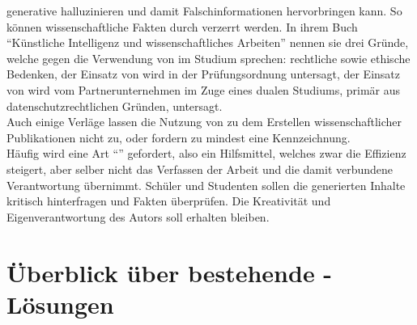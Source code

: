 \documentclass[../main.tex]{subfiles}
\begin{document}
generative  halluzinieren und damit Falschinformationen hervorbringen kann. So können wissenschaftliche Fakten durch  verzerrt werden. In ihrem Buch "`Künstliche Intelligenz und wissenschaftliches Arbeiten"' nennen sie drei 
Gründe, welche gegen die Verwendung von  im Studium sprechen: rechtliche sowie ethische Bedenken, der Einsatz von  wird in der Prüfungsordnung untersagt, 
der Einsatz von  wird vom Partnerunternehmen im Zuge eines dualen Studiums, primär aus datenschutzrechtlichen Gründen, untersagt.\cite{BucherSchwarzerHolzwweißig} \\Auch einige Verläge lassen 
die Nutzung von  zu dem Erstellen wissenschaftlicher Publikationen nicht zu, oder fordern zu mindest eine Kennzeichnung\cite{ZukunftWissenschaftlichesPublizieren}.\\ 
Häufig wird eine Art "`"' gefordert, also ein Hilfsmittel, welches zwar die Effizienz steigert, aber selber nicht das Verfassen der 
Arbeit und die damit verbundene Verantwortung übernimmt. Schüler und Studenten sollen die generierten Inhalte kritisch hinterfragen und Fakten überprüfen. Die Kreativität und 
Eigenverantwortung des Autors soll erhalten bleiben.\cite{BucherSchwarzerHolzwweißig,humanWritingToAi,teachers,ZukunftWissenschaftlichesPublizieren} 

\section{Überblick über bestehende -Lösungen}
\label{sec:bereitsBestehendeLoesungen}
\end{document}
